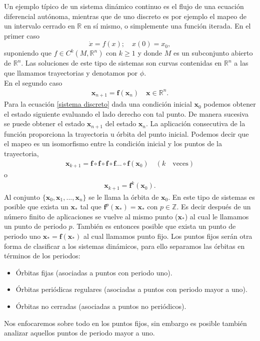 Un ejemplo típico de un sistema dinámico continuo es el flujo de una ecuación diferencial autónoma, mientras que de uno discreto es por ejemplo el mapeo de un intervalo cerrado en $\mathbb{R}$ en sí mismo, o simplemente una función iterada. En el primer caso
\begin{equation}
\dot{x} =  f(x); \quad  
x(0)=x_{0} , \label{ec dif}
\end{equation}
suponiendo que $f \in C^{k}(M,\mathbb{R}^{n})$ con $k \geq 1$ y donde $M$ es un subconjunto abierto de $\mathbb{R}^{n}$. Las soluciones de este tipo de sistemas son curvas contenidas en $\mathbb{R}^{n}$ a las que llamamos trayectorias y denotamos por $\phi$.\\
En el segundo caso  
\begin{eqnarray}
\pmb x_{n+1}= \mathbf{f}(\pmb x_{n}) \quad \pmb x\in \mathbb{R}^{n}. \label{sistema discreto}
\end{eqnarray}
Para la ecuación \ref{sistema discreto} dada una condición inicial $\pmb x_{0}$ podemos obtener el estado siguiente evaluando el lado derecho con tal punto. De manera sucesiva se puede obtener el estado $\pmb x_{n+1}$ del estado $\pmb x_{n}$. La aplicación consecutiva de la función proporciona la trayectoria u órbita del punto inicial. Podemos decir que el mapeo es un isomorfismo entre la condición inicial y los puntos de la trayectoria,
\begin{eqnarray*}
\pmb x_{k+1}=\mathbf{f}\circ\mathbf{f}\circ \mathbf{f} \circ \mathbf{f} ... \circ \mathbf{f} (\pmb x_{0})\quad (k \quad \textrm{veces})
\end{eqnarray*}
o
\begin{eqnarray*}
\pmb x_{k+1} = \mathbf{f}^{k}(\pmb x_{0}).
\end{eqnarray*}
Al conjunto $\lbrace \pmb x_{0},\pmb x_{1},...,\pmb x_{n} \rbrace$ se le llama la órbita de $\pmb x_{0}$.  En este tipo de sistemas es posible que exista un $\pmb x_{*}$ tal que $\mathbf{f}^{p}(\pmb x_{*})=\pmb x_{*}$ con $p \in \mathbb{Z}$. Es decir después de un número finito de aplicaciones se vuelve al mismo punto ($\pmb x_{*}$) al cual le llamamos un punto de periodo $p$. También es entonces posible  que exista un punto de periodo uno $\pmb x_{*}=\mathbf{f}(\pmb x_{*})$ al cual llamamos punto fijo. Los puntos fijos serán otra forma de clasificar a los sistemas dinámicos, para ello separamos las órbitas en términos de los periodos:

\begin{itemize}
\item  Órbitas fijas (asociadas a puntos con periodo uno).
\item Órbitas periódicas regulares (asociadas a puntos con periodo mayor a uno).
\item Órbitas no cerradas (asociadas a puntos no periódicos).
\end{itemize}
Nos enfocaremos sobre todo en los puntos fijos, sin embargo es posible también analizar aquellos puntos de periodo mayor a uno.
